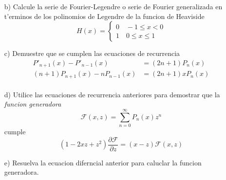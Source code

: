 \documentclass[letterpaper]{article}
\begin{document}
\begin{enumerate}
\begin{itemize}
          \item[b)] Calcule la serie de Fourier-Legendre o serie de Fourier generalizada en t'erminos de los polinomios de Legendre de la funcion de Heaviside
                \[
                H(x)=
                \begin{cases}
                  0\quad -1\leq x <0\\
                  1\quad 0\leq x \leq 1
                  \end{cases}
                \]
          \item[c)] Demuestre que se cumplen las ecuaciones de recurrencia
        \begin{align*}
          P'_{n+1}(x)-P'_{n-1}(x)&=(2n+1)P_{n}(x)\\
          (n+1)P_{n+1}(x)-nP_{n-1}(x)&=(2n+1)xP_{n}(x)\\
        \end{align*}
          \item[d)] Utilice las ecuaciones de recurrencia anteriores para demostrar que la \emph{funcion generadora}
                \[
                \mathcal{F}(x,z)=\sum_{n=0}^{\infty}P_{n}(x)z^{n}
                \]
                cumple
                \[
                (1-2xz+z^{2})\dfrac{\partial\mathcal{F}}{\partial z}=(x-z)\mathcal{F}(x,z)
                \]
          \item[e)] Resuelva la ecuacion diferncial anterior para caluclar la funcion generadora.
        \end{itemize}

\end{enumerate}
\end{document}
